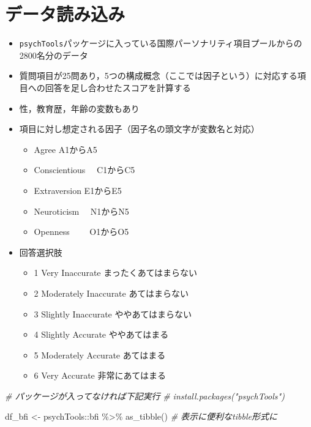 \documentclass[
  xelatex,ja=standard, b5paper]{bxjsbook}
\newenvironment{Shaded}{\begin{snugshade}}{\end{snugshade}}
\newcommand{\CommentTok}[1]{\textcolor[rgb]{0.56,0.35,0.01}{\textit{#1}}}
\newcommand{\FunctionTok}[1]{\textcolor[rgb]{0.00,0.00,0.00}{#1}}
\newcommand{\NormalTok}[1]{#1}
\newcommand{\OtherTok}[1]{\textcolor[rgb]{0.56,0.35,0.01}{#1}}
\newcommand{\SpecialCharTok}[1]{\textcolor[rgb]{0.00,0.00,0.00}{#1}}
\providecommand{\tightlist}{%
  \setlength{\itemsep}{0pt}\setlength{\parskip}{0pt}}
\begin{document}
\hypertarget{mu-read}{%
\section{データ読み込み}\label{mu-read}}

\begin{itemize}
\tightlist
\item
  \texttt{psychTools}パッケージに入っている国際パーソナリティ項目プールからの2800名分のデータ
\item
  質問項目が25問あり，5つの構成概念（ここでは因子という）に対応する項目への回答を足し合わせたスコアを計算する
\item
  性，教育歴，年齢の変数もあり
\item
  項目に対し想定される因子（因子名の頭文字が変数名と対応）

  \begin{itemize}
  \tightlist
  \item
    Agree A1からA5
  \item
    Conscientious　 C1からC5
  \item
    Extraversion E1からE5
  \item
    Neuroticism　 N1からN5
  \item
    Openness　　 O1からO5
  \end{itemize}
\item
  回答選択肢

  \begin{itemize}
  \tightlist
  \item
    1 Very Inaccurate まったくあてはまらない
  \item
    2 Moderately Inaccurate あてはまらない
  \item
    3 Slightly Inaccurate ややあてはまらない
  \item
    4 Slightly Accurate ややあてはまる
  \item
    5 Moderately Accurate あてはまる
  \item
    6 Very Accurate 非常にあてはまる
  \end{itemize}
\end{itemize}

\begin{Shaded}
\begin{Highlighting}[]
\CommentTok{\# パッケージが入ってなければ下記実行}
\CommentTok{\# install.packages("psychTools")}

\NormalTok{df\_bfi }\OtherTok{\textless{}{-}} 
\NormalTok{  psychTools}\SpecialCharTok{::}\NormalTok{bfi }\SpecialCharTok{\%\textgreater{}\%} 
  \FunctionTok{as\_tibble}\NormalTok{()         }\CommentTok{\# 表示に便利なtibble形式に}
\end{Highlighting}
\end{Shaded}
\end{document}
